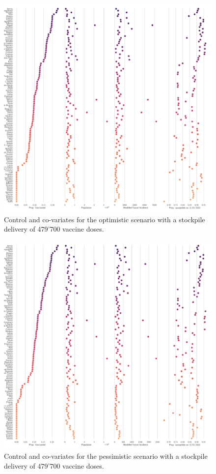 \begin{figure}[!ht]
    \centering
    \includegraphics[width=\textwidth]{fig_italy-ocp/figuresSI/SI_scatter_Optimistic.pdf}
    \caption[Control and co-variates for the optimistic scenario]{Control and co-variates for the optimistic scenario with a stockpile delivery of 479'700 vaccine doses.}
    \label{fig:OC_scatter_optimistic}
\end{figure}

\begin{figure}[!ht]
    \centering
    \includegraphics[width=\textwidth]{fig_italy-ocp/figuresSI/SI_scatter_Pessimistic.pdf}
    \caption[Control and co-variates for the pessimistic scenario]{Control and co-variates for the pessimistic scenario with a stockpile delivery of 479'700 vaccine doses.}
    \label{fig:OC_scatter_pessimistic}
\end{figure}

